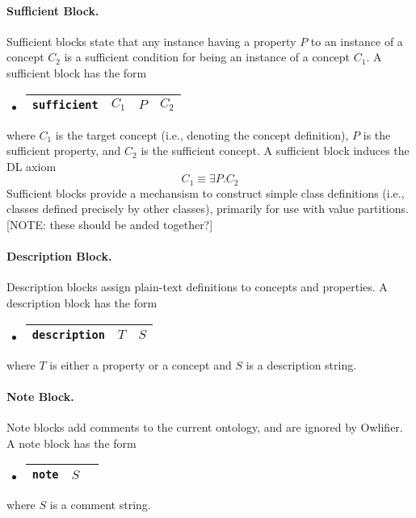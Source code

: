 \documentclass[preprint,number]{elsarticle}
\newcommand{\owlifier}{\textsf{Owlifier}}
\begin{document}
\paragraph{Sufficient Block.} Sufficient blocks state that any
instance having a property $P$ to an instance of a concept $C_2$ is a
sufficient condition for being an instance of a concept $C_1$. A
sufficient block has the form
\begin{itemize}
\item[]
  \begin{tabular}{|l|l|l|l|}\hline \texttt{sufficient} & $C_1$ & $P$ & $C_2$
    \\ \hline
  \end{tabular}
\end{itemize}
where $C_1$ is the target concept (i.e., denoting the concept
definition), $P$ is the sufficient property, and $C_2$ is the
sufficient concept. A sufficient block induces the DL axiom \[C_1
\equiv \exists P.C_2\] Sufficient blocks provide a mechansism to
construct simple class definitions (i.e., classes defined precisely by
other classes), primarily for use with value partitions. [NOTE: these
should be anded together?]

\paragraph{Description Block.} Description blocks assign plain-text
definitions to concepts and properties. A description block has the
form
\begin{itemize}
\item[]
  \begin{tabular}{|l|l|l|}\hline \texttt{description} & $T$ & $S$
\\ \hline
  \end{tabular}
\end{itemize}
where $T$ is either a property or a concept and $S$ is a description
string.

\paragraph{Note Block.} Note blocks add comments to the current
ontology, and are ignored by \owlifier.  A note block has the form
\begin{itemize}
\item[]
  \begin{tabular}{|l|l|l|}\hline \texttt{note} & $S$
\\ \hline
  \end{tabular}
\end{itemize}
where $S$ is a comment string.
\end{document}
